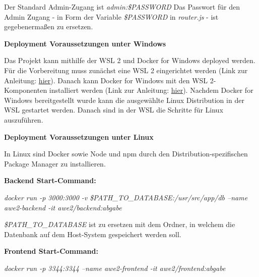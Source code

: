 Der Standard Admin-Zugang ist \textit{admin:\$PASSWORD} Das Passwort für den Admin Zugang - in Form der Variable \textit{\$PASSWORD} in \textit{router.js} - ist gegebenermaßen zu ersetzen.

\textbf{Deployment Voraussetzungen unter Windows}

Das Projekt kann mithilfe der WSL 2 und Docker for Windows deployed werden.
Für die Vorbereitung muss zunächst eine WSL 2 eingerichtet werden (Link zur Anleitung: \href{https://docs.microsoft.com/en-us/windows/wsl/install-win10}{hier}).
Danach kann Docker for Windows mit den WSL 2-Komponenten installiert werden (Link zur Anleitung: \href{https://docs.docker.com/docker-for-windows/wsl/}{hier}).
Nachdem Docker for Windows bereitgestellt wurde kann die ausgewählte Linux Distribution in der WSL gestartet werden.
Danach sind in der WSL die Schritte für Linux auszuführen.

\textbf{Deployment Voraussetzungen unter Linux}

In Linux sind Docker sowie Node und npm durch den Distribution-spezifischen Package Manager zu installieren.

\textbf{Backend Start-Command:}

\textit{docker run -p 3000:3000 -v \$PATH\_TO\_DATABASE:/usr/src/app/db --name awe2-backend -it awe2/backend:abgabe}

\textit{\$PATH\_TO\_DATABASE} ist zu ersetzen mit dem Ordner, in welchem die Datenbank auf dem Host-System gespeichert werden soll.

\textbf{Frontend Start-Command:}

\textit{docker run -p 3344:3344 --name awe2-frontend -it awe2/frontend:abgabe}
